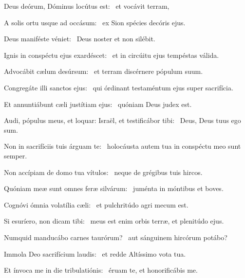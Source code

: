 \item Deus deórum, Dóminus locútus est:~\psstar{} et vocávit terram,

\item A solis ortu usque ad occásum:~\psstar{} ex Sion spécies decóris ejus.

\item Deus maniféste véniet:~\psstar{} Deus noster et non silébit.

\item Ignis in conspéctu ejus exardéscet:~\psstar{} et in circúitu ejus tempéstas válida.

\item Advocábit cælum desúrsum:~\psstar{} et terram discérnere pópulum suum.

\item Congregáte illi sanctos ejus:~\psstar{} qui órdinant testaméntum ejus super sacrifícia.

\item Et annuntiábunt cæli justítiam ejus:~\psstar{} quóniam Deus judex est.

\item Audi, pópulus meus, et loquar: Israël, et testificábor tibi:~\psstar{} Deus, Deus tuus ego sum.

\item Non in sacrifíciis tuis árguam te:~\psstar{} holocáusta autem tua in conspéctu meo sunt semper.

\item Non accípiam de domo tua vítulos:~\psstar{} neque de grégibus tuis hircos.

\item Quóniam meæ sunt omnes feræ silvárum:~\psstar{} juménta in móntibus et boves.

\item Cognóvi ómnia volatília cæli:~\psstar{} et pulchritúdo agri mecum est.

\item Si esuríero, non dicam tibi:~\psstar{} meus est enim orbis terræ, et plenitúdo ejus.

\item Numquid manducábo carnes taurórum?~\psstar{} aut sánguinem hircórum potábo?

\item Immola Deo sacrifícium laudis:~\psstar{} et redde Altíssimo vota tua.

\item Et ínvoca me in die tribulatiónis:~\psstar{} éruam te, et honorificábis me.

